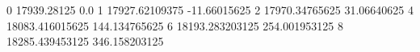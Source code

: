 0 17939.28125 0.0
1 17927.62109375 -11.66015625
2 17970.34765625 31.06640625
4 18083.416015625 144.134765625
6 18193.283203125 254.001953125
8 18285.439453125 346.158203125
